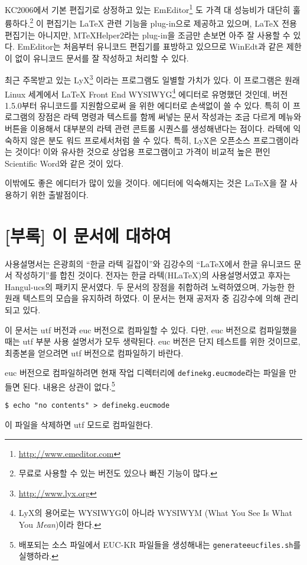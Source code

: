 KC2006에서 기본 편집기로 상정하고 있는 EmEditor\footnote{%
  \url{http://www.emeditor.com}}%
도 가격 대 성능비가 대단히 훌륭하다.\footnote{%
  무료로 사용할 수 있는 버전도 있으나 빠진 기능이 많다.}
이 편집기는 \LaTeX{} 관련 기능을 plug-in으로 제공하고 있으며,
\LaTeX{} 전용 편집기는 아니지만, MTeXHelper2라는 plug-in을
조금만 손보면 아주 잘 사용할 수 있다. EmEditor는 처음부터 유니코드
편집기를 표방하고 있으므로 WinEdt과 같은 제한이 없이 유니코드 문서를
잘 작성하고 처리할 수 있다. 

최근 주목받고 있는 LyX\footnote{%
  \url{http://www.lyx.org}}%
이라는 프로그램도 일별할 가치가 있다.
이 프로그램은 원래 Linux 세계에서 \LaTeX{} Front End WYSIWYG\footnote{%
   LyX의 용어로는 WYSIWYG이 아니라 WYSIWYM (What You See Is What You \emph{Mean})이라 한다.}
에디터로 유명했던 것인데, 버전 1.5.0부터 유니코드를 지원함으로써
\kotex 을 위한 에디터로 손색없이 쓸 수 있다. 특히 이 프로그램의
장점은 라텍 명령과 텍스트를 함께 써넣는 문서 작성과는 조금 다르게
메뉴와 버튼을 이용해서 대부분의 라텍 관련 콘트롤 시퀀스를 생성해낸다는
점이다. 라텍에 익숙하지 않은 분도 워드 프로세서처럼 쓸 수 있다.
특히, LyX은 오픈소스 프로그램이라는 것이다! 이와 유사한 것으로 상업용
프로그램이고 가격이 비교적 높은 편인 Scientific Word와 같은 것이
있다. 

이밖에도 좋은 에디터가 많이 있을 것이다. 에디터에 익숙해지는 것은
\LaTeX 을 잘 사용하기 위한 출발점이다.

\clearpage{}
\section*{[부록] 이 문서에 대하여}

\kotex{} 사용설명서는 은광희의 ``한글 라텍 길잡이''와 김강수의
``\LaTeX 에서 한글 유니코드 문서 작성하기''를 합친 것이다.
전자는 한글 라텍(H\LaTeX)의 사용설명서였고 후자는 Hangul-ucs의
패키지 문서였다. 두 문서의 장점을 취합하려 노력하였으며, 가능한 한
원래 텍스트의 모습을 유지하려 하였다. 
이 문서는 현재 공저자 중 김강수에 의해 관리되고 있다.

이 문서는 utf 버전과 euc 버전으로 컴파일할 수 있다. 다만, euc 버전으로
컴파일했을 때는 utf 부분 사용 설명서가 모두 생략된다. euc 버전은
단지 테스트를 위한 것이므로, 최종본을 얻으려면 utf 버전으로 컴파일하기
바란다.

euc 버전으로 컴파일하려면 
현재 작업 디렉터리에 \texttt{definekg.eucmode}라는
파일을 만들면 된다. 내용은 상관이 없다.\footnote{%
  배포되는 소스 파일에서 EUC-KR 파일들을
  생성해내는 \texttt{generateeucfiles.sh}를
  실행하라.}
\begin{verbatim}
$ echo "no contents" > definekg.eucmode
\end{verbatim}
이 파일을 삭제하면 utf 모드로 컴파일한다.

